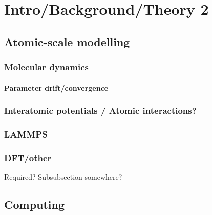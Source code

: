 \chapter{Intro/Background/Theory 2} %

\label{Chapter2} %



\section{Atomic-scale modelling}

\subsection{Molecular dynamics}

\subsubsection{Parameter drift/convergence}

\subsection{Interatomic potentials / Atomic interactions?}

\subsection{LAMMPS}

\subsection{DFT/other}
Required? Subsubsection somewhere?



\section{Computing \tc}

